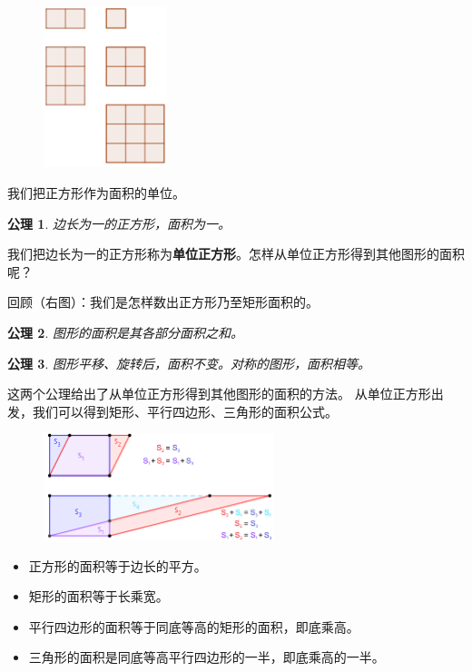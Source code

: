 \documentclass[12pt,UTF8]{ctexbook}
\newtheorem{po}{公理}
\begin{document}
\begin{figure} 
    \vspace{-30pt}
    \flushright
    \includegraphics[width=0.32\textwidth]{tu/面积_矩形1.png}
\end{figure}

我们把正方形作为面积的单位。
\begin{po}
    边长为一的正方形，面积为一。
\end{po}

我们把边长为一的正方形称为\textbf{单位正方形}。怎样从单位正方形得到其他图形的面积呢？

回顾（右图）：我们是怎样数出正方形乃至矩形面积的。

\begin{po}
    图形的面积是其各部分面积之和。
\end{po}

\begin{po}
    图形平移、旋转后，面积不变。对称的图形，面积相等。
\end{po}
这两个公理给出了从单位正方形得到其他图形的面积的方法。
从单位正方形出发，我们可以得到矩形、平行四边形、三角形的面积公式。

\begin{figure}[H] %
    \vspace{4pt}
    \centering
    \includegraphics[width=0.6\textwidth]{tu/面积_平行四边形1.png}
\end{figure}

\begin{itemize}
    \item 正方形的面积等于边长的平方。
    \item 矩形的面积等于长乘宽。
    \item 平行四边形的面积等于同底等高的矩形的面积，即底乘高。
    \item 三角形的面积是同底等高平行四边形的一半，即底乘高的一半。
\end{itemize}
\end{document}
